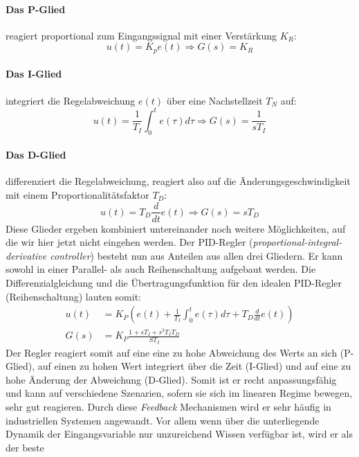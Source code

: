 \paragraph{Das P-Glied} reagiert proportional zum Eingangssignal mit einer Verstärkung $K_R$:
\begin{equation}
u(t) = K_p e(t) \Rightarrow G(s) = K_R
\end{equation}
\paragraph{Das I-Glied} integriert die Regelabweichung $e(t)$ über eine Nachstellzeit $T_N$ auf:
\begin{equation}
u(t)= \frac{1}{T_I}\int_{0}^{t}e(\tau)d\tau \Rightarrow G(s) = \frac{1}{sT_I}
\end{equation}
\paragraph{Das D-Glied} differenziert die Regelabweichung, reagiert also auf die
Änderungsgeschwindigkeit mit einem Proportionalitätsfaktor $T_D$:
\begin{equation}
u(t) = T_D \frac{d}{dt}e(t) \Rightarrow G(s) = s T_D
\end{equation}
Diese Glieder ergeben kombiniert untereinander noch weitere Möglichkeiten, auf die wir
hier jetzt nicht eingehen werden.
Der PID-Regler (\textit{proportional-integral-derivative controller}) besteht nun aus Anteilen
aus allen drei Gliedern. Er kann sowohl in einer Parallel- als auch Reihenschaltung aufgebaut
werden. Die Differenzialgleichung und die Übertragungsfunktion
für den idealen PID-Regler (Reihenschaltung) lauten somit:
\begin{align}
u(t) &= K_P \left( e(t) + \frac{1}{T_I} \int_{0}^{t} e(\tau) d\tau + T_D \frac{d}{dt} e(t) \right)\\
G(s) &= K_P \frac{1 + s T_I + s^2 T_I T_D}{S T_I}
\end{align}
Der Regler reagiert somit auf eine eine zu hohe Abweichung des Werts an sich (P-Glied), auf einen
zu hohen Wert integriert über die Zeit (I-Glied) und auf eine zu hohe Änderung der Abweichung
(D-Glied). Somit ist er recht anpassungsfähig und kann auf verschiedene Szenarien, sofern sie sich
im linearen Regime bewegen, sehr gut reagieren. Durch diese \textit{Feedback} Mechanismen wird
er sehr häufig in industriellen Systemen angewandt. Vor allem wenn über die unterliegende
Dynamik der Eingangsvariable nur unzureichend Wissen verfügbar ist, wird er als der beste
